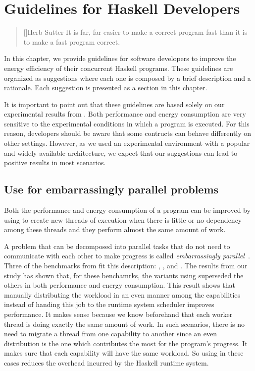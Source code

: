 \chapter{Guidelines for Haskell Developers}\label{chp:guide}

\begin{quotation}[]{Herb Sutter}
It is far, far easier to make a correct program fast than it is to make a fast program correct.
\end{quotation}

In this chapter, we provide guidelines for software developers to improve the energy efficiency of their concurrent Haskell programs. These guidelines are organized as suggestions where each one is composed by a brief description and a rationale. Each suggestion is presented as a section in this chapter.

It is important to point out that these guidelines are based solely on our experimental results from . Both performance and energy consumption are very sensitive to the experimental conditions in which a program is executed. For this reason, developers should be aware that some contructs can behave differently on other settings. However, as we used an experimental environment with a popular and widely available architecture, we expect that our suggestions can lead to positive results in most scenarios.


\section{Use \forkOn for embarrassingly parallel problems}
 Both the performance and energy consumption of a program can be improved by using \forkOn to create new threads of execution when there is little or no dependency among these threads and they perform almost the same amount of work.
\newline

 A problem that can be decomposed into parallel tasks that do not need to communicate with each other to make progress is called \emph{embarrassingly parallel}~\cite{herlihy:2012}. Three of the benchmarks from  fit this description: \mandelbrot, \regex, and \spectral. The results from our study has shown that, for these benchamrks, the variants using \forkOn superseded the others in both performance and energy consumption. This result shows that manually distributing the workload in an even manner among the capabilities instead of handing this job to the runtime system scheduler improves performance. It makes sense because we know beforehand that each worker thread is doing exactly the same amount of work. In such scenarios, there is no need to migrate a thread from one capability to another since an even distribution is the one which contributes the most for the program's progress. It makes sure that each capability will have the same workload. So using \forkOn in these cases reduces the overhead incurred by the Haskell runtime system.

